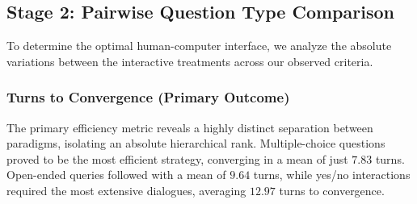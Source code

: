 \begin{table}[t]
\centering
\setlength{\tabcolsep}{8pt} 
\begin{minipage}{\wd\tabletwobox}
\centering
\usebox{\tabletwobox}
\vspace{0.2cm}
\caption{Granular Breakdown of LLM-as-Judge Faithfulness Sub-Metrics}
\label{tab:submetrics_breakdown}
\end{minipage}
\end{table}

\subsection{Stage 2: Pairwise Question Type Comparison}
To determine the optimal human-computer interface, we analyze the absolute variations between the interactive treatments across our observed criteria.

\subsubsection{Turns to Convergence (Primary Outcome)}
The primary efficiency metric reveals a highly distinct separation between paradigms, isolating an absolute hierarchical rank. 
Multiple-choice questions proved to be the most efficient strategy, converging in a mean of just $7.83$ turns. 
Open-ended queries followed with a mean of $9.64$ turns, while yes/no interactions required the most extensive dialogues, averaging $12.97$ turns to convergence.


